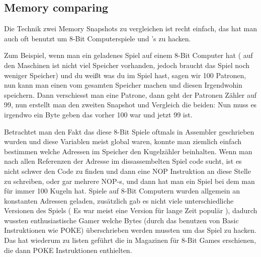 \subsection{Memory  comparing}
\label{snapshots_comparing}

Die Technik zwei Memory Snapshots zu vergleichen ist recht einfach, das hat man auch oft benutzt um 8-Bit Computerspiele und
's  zu hacken.

Zum Beispiel, wenn man ein geladenes Spiel auf einem 8-Bit Computer hat ( auf den Maschinen ist nicht viel Speicher 
vorhanden, jedoch braucht das Spiel noch weniger Speicher) und du weißt was du im Spiel hast, sagen wir 100 Patronen, 
nun kann man einen  vom gesamten Speicher machen und diesen Irgendwohin speichern. Dann verschiesst man 
eine Patrone, dann geht der Patronen Z\"ahler auf 99, nun erstellt man den zweiten Snapshot und Vergleich die beiden: 
Nun muss es irgendwo ein Byte geben das vorher 100 war und jetzt 99 ist. 

Betrachtet man den Fakt das diese 8-Bit Spiele oftmals in Assembler geschrieben wurden und diese Variablen meist global 
waren, konnte man ziemlich einfach bestimmen welche Adressen im Speicher den Kugelz\"ahler beinhalten. Wenn man nach allen 
Referenzen der Adresse im dissassembelten Spiel code sucht, ist es nicht schwer den Code  
zu finden und dann eine \gls{NOP} Instruktion an diese Stelle zu schreiben, oder gar mehrere \gls{NOP}-s, und dann hat man 
ein Spiel bei dem man f\"ur immer 100 Kugeln hat. %
Spiele auf 8-Bit Computern wurden allgemein an konstanten Adressen geladen, zus\"atzlich gab es nicht viele unterschiedliche
Versionen des Spiels (  Es war meist eine Version f\"ur lange Zeit popul\"ar ), dadurch wussten enthusiastische Gamer welche
Bytes (durch das benutzen von Basic Instruktionen wie \gls{POKE}) \"uberschrieben werden mussten um das Spiel zu hacken. 
Das hat wiederum zu  listen gef\"uhrt die in Magazinen f\"ur 8-Bit Games erschienen, die dann \gls{POKE} Instruktionen enthielten.


